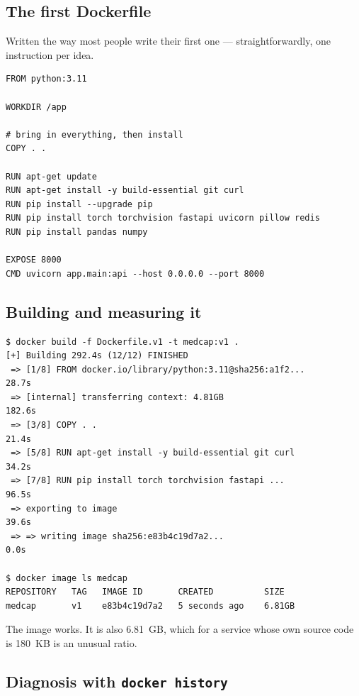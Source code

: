 \documentclass[10pt,a4paper]{article}
\newcommand{\cmd}[1]{\texttt{\small #1}}
\begin{document}
\subsection{The first Dockerfile}

Written the way most people write their first one --- straightforwardly,
one instruction per idea.

\begin{lstlisting}[style=dfile,caption={\texttt{Dockerfile.v1} --- correct, and badly wrong.}]
FROM python:3.11

WORKDIR /app

# bring in everything, then install
COPY . .

RUN apt-get update
RUN apt-get install -y build-essential git curl
RUN pip install --upgrade pip
RUN pip install torch torchvision fastapi uvicorn pillow redis
RUN pip install pandas numpy

EXPOSE 8000
CMD uvicorn app.main:api --host 0.0.0.0 --port 8000
\end{lstlisting}

\subsection{Building and measuring it}

\begin{lstlisting}[style=shell]
$ docker build -f Dockerfile.v1 -t medcap:v1 .
[+] Building 292.4s (12/12) FINISHED
 => [1/8] FROM docker.io/library/python:3.11@sha256:a1f2...         28.7s
 => [internal] transferring context: 4.81GB                        182.6s
 => [3/8] COPY . .                                                 21.4s
 => [5/8] RUN apt-get install -y build-essential git curl          34.2s
 => [7/8] RUN pip install torch torchvision fastapi ...            96.5s
 => exporting to image                                             39.6s
 => => writing image sha256:e83b4c19d7a2...                          0.0s

$ docker image ls medcap
REPOSITORY   TAG   IMAGE ID       CREATED          SIZE
medcap       v1    e83b4c19d7a2   5 seconds ago    6.81GB
\end{lstlisting}

The image works. It is also 6.81~GB, which for a service whose own source
code is 180~KB is an unusual ratio.

\subsection{Diagnosis with \cmd{docker history}}
\end{document}
